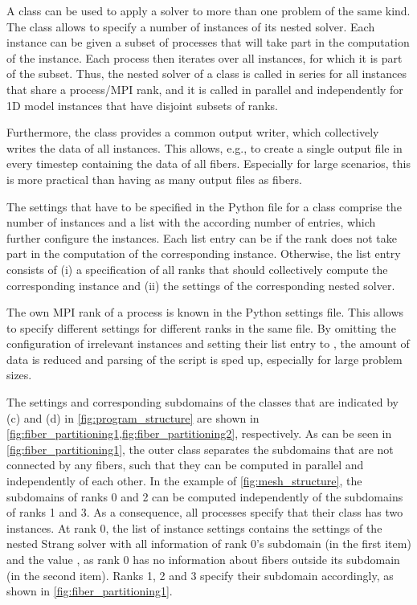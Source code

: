 A  class can be used to apply a solver to more than one problem of the same kind. The class allows to specify a number of instances of its nested solver. Each instance can be given a subset of processes that will take part in the computation of the instance. Each process then iterates over all instances, for which it is part of the subset. Thus, the nested solver of a  class is called in series for all instances that share a process/MPI rank, and it is called in parallel and independently for 1D model instances that have disjoint subsets of ranks.

Furthermore, the class provides a common output writer, which collectively writes the data of all instances. This allows, e.g., to create a single output file in every timestep containing the data of all fibers. Especially for large scenarios, this is more practical than having as many output files as fibers.

The settings that have to be specified in the Python file for a  class comprise the number of instances and a list with the according number of entries, which further configure the instances. Each list entry can be  if the rank does not take part in the computation of the corresponding instance. 
Otherwise, the list entry consists of (i) a specification of all ranks that should collectively compute the corresponding instance and (ii) the settings of the corresponding nested solver. 

The own MPI rank of a process is known in the Python settings file. This allows to specify different settings for different ranks in the same file. By omitting the configuration of irrelevant instances and setting their list entry to , the amount of data is reduced and parsing of the script is sped up, especially for large problem sizes.

The settings and corresponding subdomains of the  classes that are indicated by (c) and (d) in \cref{fig:program_structure} are shown in \cref{fig:fiber_partitioning1,fig:fiber_partitioning2}, respectively.
As can be seen in \cref{fig:fiber_partitioning1}, the outer  class separates the subdomains that are not connected by any fibers, such that they can be computed in parallel and independently of each other. In the example of \cref{fig:mesh_structure}, the subdomains of ranks 0 and 2 can be computed independently of the subdomains of ranks 1 and 3. 
As a consequence, all processes specify that their  class has two instances. 
At rank 0, the list of instance settings contains the settings of the nested Strang solver with all information of rank 0's subdomain (in the first item) and the value , as rank 0 has no information about fibers outside its subdomain (in the second item). Ranks 1, 2 and 3 specify their subdomain accordingly, as shown in \cref{fig:fiber_partitioning1}.

